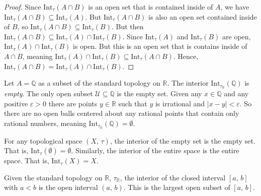 \documentclass{article}
\theoremstyle{plain}
\theoremstyle{normal}
\newenvironment{example}{%
    \pushQED{\qed}\renewcommand{\qedsymbol}{$\blacksquare$}\examplex%
}{%
    \popQED\endexamplex%
}
\begin{document}
        \begin{proof}
            Since $\textrm{Int}_{\tau}(A\cap{B})$ is an open set that is
            contained inside of $A$, we have
            $\textrm{Int}_{\tau}(A\cap{B})\subseteq\textrm{Int}_{\tau}(A)$. But
            $\textrm{Int}_{\tau}(A\cap{B})$ is also an open set contained inside
            of $B$, so
            $\textrm{Int}_{\tau}(A\cap{B})\subseteq\textrm{Int}_{\tau}(B)$.
            But then
            $\textrm{Int}_{\tau}(A\cap{B})\subseteq\textrm{Int}_{\tau}(A)\cap\textrm{Int}_{\tau}(B)$.
            Since $\textrm{Int}_{\tau}(A)$ and $\textrm{Int}_{\tau}(B)$ are
            open, $\textrm{Int}_{\tau}(A)\cap\textrm{Int}_{\tau}(B)$ is open.
            But this is an open set that is contains inside of
            $A\cap{B}$, meaning
            $\textrm{Int}_{\tau}(A)\cap\textrm{Int}_{\tau}(B)\subseteq\textrm{Int}_{\tau}(A\cap{B})$.
            Hence,
            $\textrm{Int}_{\tau}(A\cap{B})=\textrm{Int}_{\tau}(A)\cap\textrm{Int}_{\tau}(B)$.
        \end{proof}
        \begin{example}
            Let $A=\mathbb{Q}$ as a subset of the standard topology on
            $\mathbb{R}$. The interior
            $\textrm{Int}_{\tau_{\mathbb{R}}}(\mathbb{Q})$ is \textit{empty}.
            The only open subset $\mathcal{U}\subseteq\mathbb{Q}$ is the empty
            set. Given any $x\in\mathbb{Q}$ and any positive $\varepsilon>0$
            there are points $y\in\mathbb{R}$ such that $y$ is irrational
            and $|x-y|<\varepsilon$. So there are no open balls centered about
            any rational points that contain only rational numbers, meaning
            $\textrm{Int}_{\tau_{\mathbb{R}}}(\mathbb{Q})=\emptyset$.
        \end{example}
        \begin{example}
            For any topological space $(X,\,\tau)$, the interior of the empty
            set is the empty set. That is,
            $\textrm{Int}_{\tau}(\emptyset)=\emptyset$. Similarly, the interior
            of the entire space is the entire space. That is,
            $\textrm{Int}_{\tau}(X)=X$.
        \end{example}
        \begin{example}
            Given the standard topology on $\mathbb{R}$, $\tau_{\mathbb{R}}$,
            the interior of the closed interval $[a,\,b]$ with
            $a<b$ is the open interval $(a,\,b)$. This is the largest open
            subset of $[a,\,b]$.
        \end{example}
\end{document}
